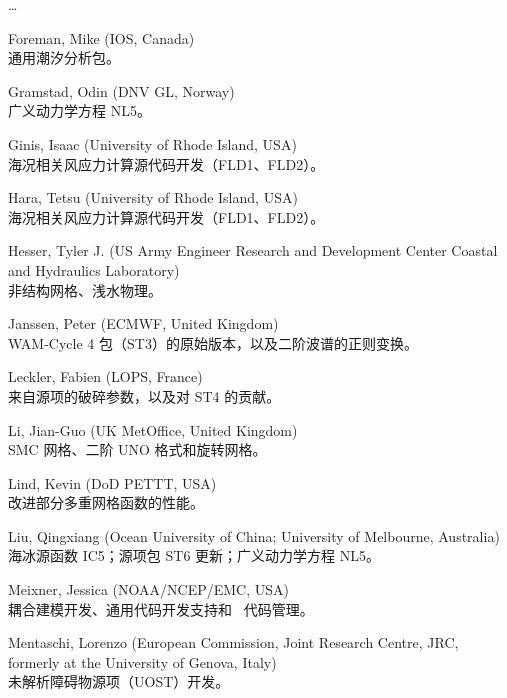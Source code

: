 \begin{list}{\ldots}{ }
\item [Foreman, Mike]  (IOS, Canada) \\
  通用潮汐分析包。

\item [Gramstad, Odin] (DNV GL, Norway)\\
  广义动力学方程 NL5。

\item [Ginis, Isaac] (University of Rhode Island, USA) \\
  海况相关风应力计算源代码开发（FLD1、FLD2）。

\item [Hara, Tetsu] (University of Rhode Island, USA) \\
  海况相关风应力计算源代码开发（FLD1、FLD2）。

\item [Hesser, Tyler J.] (US Army Engineer Research and Development Center Coastal and Hydraulics Laboratory) \\
  非结构网格、浅水物理。

\item [Janssen, Peter] (ECMWF, United Kingdom) \\
  WAM-Cycle 4 包（ST3）的原始版本，以及二阶波谱的正则变换。

\item [Leckler, Fabien] (LOPS, France) \\
  来自源项的破碎参数，以及对 ST4 的贡献。

\item [Li, Jian-Guo] (UK MetOffice, United Kingdom) \\
  SMC 网格、二阶 UNO 格式和旋转网格。

\item [Lind, Kevin]  (DoD PETTT, USA)\\
  改进部分多重网格函数的性能。

\item [Liu, Qingxiang] (Ocean University of China; University of Melbourne, Australia)\\
  海冰源函数 IC5；源项包 ST6 更新；广义动力学方程 NL5。

\item [Meixner, Jessica] (NOAA/NCEP/EMC, USA) \\
  耦合建模开发、通用代码开发支持和 \ws\ 代码管理。

\item [Mentaschi, Lorenzo]  (European Commission, Joint Research Centre, JRC,
  formerly at the University of Genova, Italy)\\
  未解析障碍物源项（UOST）开发。


\end{list}
